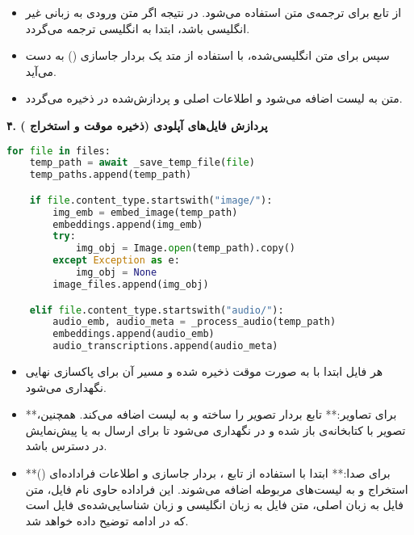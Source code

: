 \documentclass{article}
\begin{document}
\begin{itemize}
    \item از تابع  برای ترجمه‌ی متن استفاده می‌شود. در نتیجه اگر متن ورودی به زبانی غیر انگلیسی باشد، ابتدا به انگلیسی ترجمه می‌گردد.
    \item سپس برای متن انگلیسی‌شده، با استفاده از متد  یک بردار جاسازی () به دست می‌آید.
    \item {} متن به لیست  اضافه می‌شود و اطلاعات اصلی و پردازش‌شده در  ذخیره می‌گردد.
\end{itemize}

\textbf{۴. پردازش فایل‌های آپلودی (ذخیره موقت و استخراج )}

\begin{latin}
\begin{lstlisting}[language=Python]
for file in files:
    temp_path = await _save_temp_file(file)
    temp_paths.append(temp_path)

    if file.content_type.startswith("image/"):
        img_emb = embed_image(temp_path)
        embeddings.append(img_emb)
        try:
            img_obj = Image.open(temp_path).copy()
        except Exception as e:
            img_obj = None
        image_files.append(img_obj)

    elif file.content_type.startswith("audio/"):
        audio_emb, audio_meta = _process_audio(temp_path)
        embeddings.append(audio_emb)
        audio_transcriptions.append(audio_meta)
\end{lstlisting}
\end{latin}

\begin{itemize}
    \item هر فایل ابتدا با  به صورت موقت ذخیره شده و مسیر آن برای پاکسازی نهایی نگهداری می‌شود.
    \item **برای تصاویر:** تابع  بردار تصویر را ساخته و به لیست اضافه می‌کند. همچنین، تصویر با کتابخانه‌ی  باز شده و در  نگهداری می‌شود تا برای ارسال به  یا پیش‌نمایش در دسترس باشد.
    \item **برای صدا:** ابتدا با استفاده از تابع ، بردار جاسازی و اطلاعات فراداده‌ای () استخراج و به لیست‌های مربوطه اضافه می‌شوند. این فراداده حاوی نام فایل، متن فایل به زبان اصلی، متن فایل به زبان انگلیسی و زبان شناسایی‌شده‌ی فایل است که در ادامه توضیح داده خواهد شد.
\end{itemize}
\end{document}
